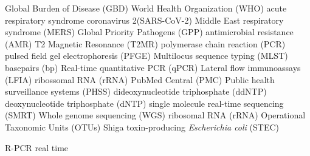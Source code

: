 Global Burden of Disease (GBD)
World Health Organization (WHO)
acute  respiratory  syndrome  coronavirus  2(SARS-CoV-2)
Middle East respiratory syndrome (MERS)
Global Priority Pathogens (GPP)
antimicrobial resistance (AMR)
T2 Magnetic Resonance (T2MR)
polymerase chain reaction (PCR)
pulsed field gel electrophoresis (PFGE)
Multilocus sequence typing (MLST)
basepairs (bp)
Real-time quantitative PCR (qPCR)
Lateral flow immunoassays (LFIA)
ribossomal RNA (rRNA)
PubMed Central\textsuperscript{\small\textregistered} (PMC)
Public health surveillance systems (PHSS)
dideoxynucleotide triphosphate (ddNTP) 
deoxynucleotide triphosphate (dNTP)
single molecule real-time sequencing (SMRT)
Whole genome sequencing (WGS)
ribosomal RNA (rRNA)
Operational Taxonomic Units (OTUs)
Shiga toxin-producing \textit{Escherichia coli} (STEC)


R-PCR real time 